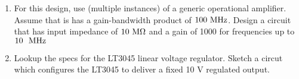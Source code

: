 \documentclass[12pt]{article}
\begin{document}
\begin{enumerate}
\item For this design, use (multiple instances) of a generic
  operational amplifier.  Assume that is has a gain-bandwidth product
  of $100~\rm MHz$.  Design a circuit that has input impedance of
  $10~\rm M\Omega$ and a gain of 1000 for frequencies up to
  $10~\rm~MHz$

\item Lookup the specs for the LT3045 linear voltage regulator.  Sketch a circut which configures the LT3045 to deliver a fixed 10 V regulated output.
  
  
\end{enumerate}



 
\end{document}
